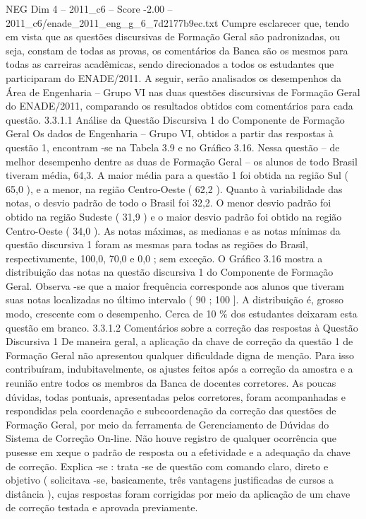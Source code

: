 \begin{textsample}{NEG Dim 4 – 2011\_c6 – Score -2.00 – 2011\_c6/enade\_2011\_eng\_g\_6\_7d2177b9ec.txt}
Cumpre esclarecer que, tendo em vista que as questões discursivas de Formação Geral são padronizadas, ou seja, constam de todas as provas, os comentários da Banca são os mesmos para todas as carreiras acadêmicas, sendo direcionados a todos os estudantes que participaram do ENADE/2011.
A seguir, serão analisados os desempenhos da Área de Engenharia – Grupo VI nas duas questões discursivas de Formação Geral do ENADE/2011, comparando os resultados obtidos com comentários para cada questão. 3.3.1.1 Análise da Questão Discursiva 1 do Componente de Formação Geral Os dados de Engenharia – Grupo VI, obtidos a partir das respostas à questão 1, encontram -se na Tabela 3.9 e no Gráfico 3.16.
Nessa questão – de melhor desempenho dentre as duas de Formação Geral – os alunos de todo Brasil tiveram média, 64,3.
A maior média para a questão 1 foi obtida na região Sul ( 65,0 ), e a menor, na região Centro-Oeste ( 62,2 ).
Quanto à variabilidade das notas, o desvio padrão de todo o Brasil foi 32,2.
O menor desvio padrão foi obtido na região Sudeste ( 31,9 ) e o maior desvio padrão foi obtido na região Centro-Oeste ( 34,0 ).
As notas máximas, as medianas e as notas mínimas da questão discursiva 1 foram as mesmas para todas as regiões do Brasil, respectivamente, 100,0, 70,0 e 0,0 ; sem exceção.
O Gráfico 3.16 mostra a distribuição das notas na questão discursiva 1 do Componente de Formação Geral.
Observa -se que a maior frequência corresponde aos alunos que tiveram suas notas localizadas no último intervalo ( 90 ; 100 ].
A distribuição é, grosso modo, crescente com o desempenho.
Cerca de 10 \% dos estudantes deixaram esta questão em branco. 3.3.1.2 Comentários sobre a correção das respostas à Questão Discursiva 1 De maneira geral, a aplicação da chave de correção da questão 1 de Formação Geral não apresentou qualquer dificuldade digna de menção.
Para isso contribuíram, indubitavelmente, os ajustes feitos após a correção da amostra e a reunião entre todos os membros da Banca de docentes corretores.
As poucas dúvidas, todas pontuais, apresentadas pelos corretores, foram acompanhadas e respondidas pela coordenação e subcoordenação da correção das questões de Formação Geral, por meio da ferramenta de Gerenciamento de Dúvidas do Sistema de Correção On-line.
Não houve registro de qualquer ocorrência que pusesse em xeque o padrão de resposta ou a efetividade e a adequação da chave de correção.
Explica -se : trata -se de questão com comando claro, direto e objetivo ( solicitava -se, basicamente, três vantagens justificadas de cursos a distância ), cujas respostas foram corrigidas por meio da aplicação de um chave de correção testada e aprovada previamente.

\end{textsample}
